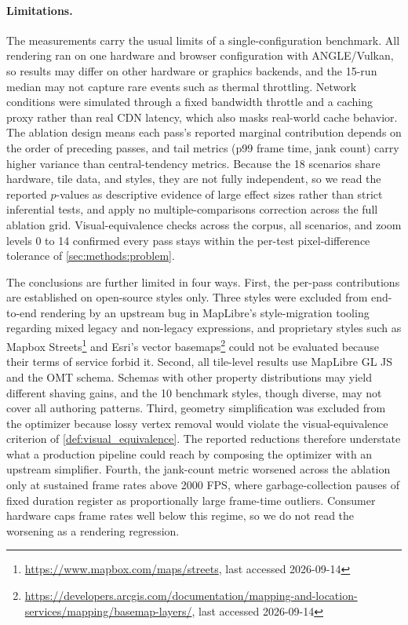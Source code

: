 \paragraph*{Limitations.}
The measurements carry the usual limits of a single-configuration benchmark.
All rendering ran on one hardware and browser configuration with ANGLE/Vulkan, so results may differ on other hardware or graphics backends, and the 15-run median may not capture rare events such as thermal throttling.
Network conditions were simulated through a fixed bandwidth throttle and a caching proxy rather than real \ac{CDN} latency, which also masks real-world cache behavior.
The ablation design means each pass's reported marginal contribution depends on the order of preceding passes, and tail metrics (p99 frame time, jank count) carry higher variance than central-tendency metrics.
Because the \num{18} scenarios share hardware, tile data, and styles, they are not fully independent, so we read the reported $p$-values as descriptive evidence of large effect sizes rather than strict inferential tests, and apply no multiple-comparisons correction across the full ablation grid.
Visual-equivalence checks across the corpus, all scenarios, and zoom levels 0 to 14 confirmed every pass stays within the per-test pixel-difference tolerance of \cref{sec:methods:problem}.

The conclusions are further limited in four ways.
First, the per-pass contributions are established on open-source styles only.
Three styles were excluded from end-to-end rendering by an upstream bug in MapLibre's style-migration tooling regarding mixed legacy and non-legacy expressions, and proprietary styles such as Mapbox Streets\footnote{\url{https://www.mapbox.com/maps/streets}, last accessed 2026-09-14} and Esri's vector basemaps\footnote{\url{https://developers.arcgis.com/documentation/mapping-and-location-services/mapping/basemap-layers/}, last accessed 2026-09-14} could not be evaluated because their terms of service forbid it.
Second, all tile-level results use MapLibre GL JS and the \ac{OMT} schema.
Schemas with other property distributions may yield different shaving gains, and the 10 benchmark styles, though diverse, may not cover all authoring patterns.
Third, geometry simplification was excluded from the optimizer because lossy vertex removal would violate the visual-equivalence criterion of \cref{def:visual_equivalence}.
The reported reductions therefore understate what a production pipeline could reach by composing the optimizer with an upstream simplifier.
Fourth, the jank-count metric worsened across the ablation only at sustained frame rates above \num{2000} \ac{FPS}, where garbage-collection pauses of fixed duration register as proportionally large frame-time outliers.
Consumer hardware caps frame rates well below this regime, so we do not read the worsening as a rendering regression.
